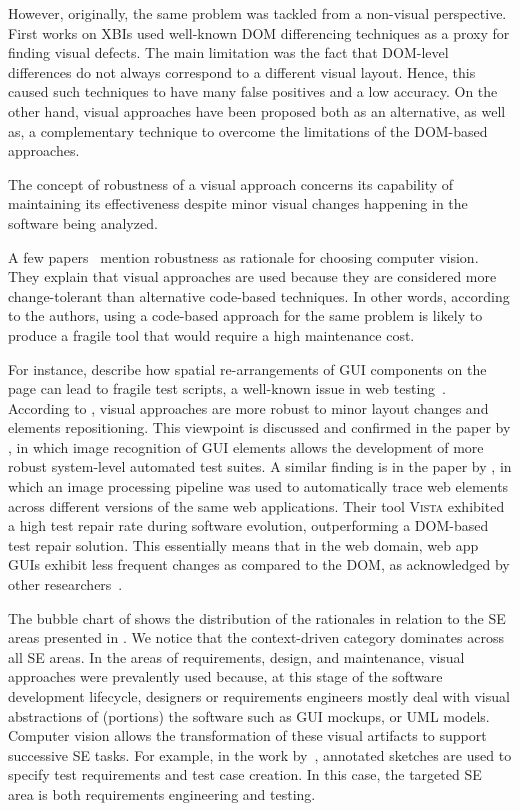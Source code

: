 However, originally, the same problem was tackled from a non-visual perspective.
First works on XBIs used well-known DOM differencing techniques as a proxy for finding visual defects. %
The main limitation was the fact that DOM-level differences do not always
correspond to a different visual layout.
Hence, this caused such techniques to have many false positives and a low accuracy.
On the other hand, visual approaches have been proposed both as an alternative,
as well as, a complementary technique to overcome the limitations of the DOM-based approaches. 

The concept of robustness of a visual approach concerns its capability of maintaining
its effectiveness despite minor visual changes happening in the software being analyzed.

A few papers~\cite{Chang-2010-CHI,Alegroth-2013-ICST,Tanno-2018-ICSTW} mention robustness
as rationale for choosing computer vision.
They explain that visual approaches are used because they are considered more change-tolerant than
alternative code-based techniques. In other words, according to the authors, using a code-based approach for the
same problem is likely to produce a fragile tool that would require a high maintenance cost. 

For instance, \citet{Chang-2010-CHI} describe how spatial re-arrangements of GUI components on the page
can lead to fragile test scripts, a well-known issue in web testing~\cite{Leotta-2016-JSEP}.
According to \citet{Chang-2010-CHI}, visual approaches are more robust to minor layout changes and
elements repositioning.
This viewpoint is discussed and confirmed in the paper by \citet{Alegroth-2013-ICST},
in which image recognition of GUI elements allows the development of more robust system-level automated test suites. 
A similar finding is in the paper by \citet{Stocco-2018-FSE}, in which an image processing pipeline was used to automatically trace web elements across different versions of the same web applications. Their tool \textsc{Vista} exhibited a high test repair rate during software evolution, outperforming a DOM-based test repair solution. This essentially means that in the web domain, web app GUIs exhibit less frequent changes as compared to the DOM, as acknowledged by other researchers~\cite{2015-Leotta-ICST,2016-Leotta-JSEP,Hammoudi-2016-FSE,Hammoudi-2016-ICST}.

The bubble chart of  shows the distribution of the rationales
in relation to the SE areas presented in .
We notice that the context-driven category dominates across all SE areas.
In the areas of requirements, design, and maintenance, visual approaches were
prevalently used because, at this stage of the software development lifecycle,
designers or requirements engineers mostly deal with visual abstractions of
(portions) the software such as GUI mockups, or UML models.
Computer vision allows the transformation of these visual artifacts to support successive SE tasks.
For example, in the work by~\citet{Zhang-2017-ASE}, annotated sketches are used
to specify test requirements and test case creation. In this case, the targeted SE
area is both requirements engineering and testing. 


